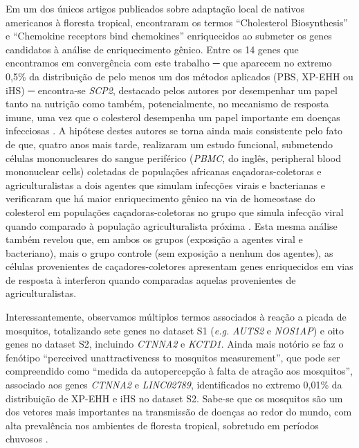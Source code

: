 Em um dos únicos artigos publicados sobre adaptação local de nativos americanos à floresta tropical,  encontraram os termos “Cholesterol Biosynthesis” e “Chemokine receptors bind chemokines” enriquecidos ao submeter os genes candidatos à análise de enriquecimento gênico. Entre os 14 genes que encontramos em convergência com este trabalho ─ que aparecem no extremo 0,5\% da distribuição de pelo menos um dos métodos aplicados (PBS, XP-EHH ou iHS) ─ encontra-se \textsl{SCP2}, destacado pelos autores por desempenhar um papel tanto na nutrição como também, potencialmente, no mecanismo de resposta imune, uma vez que o colesterol desempenha um papel importante em doenças infecciosas \cite{lee_cholesterol_2008}. A hipótese destes autores se torna ainda mais consistente pelo fato de que, quatro anos mais tarde,  realizaram um estudo funcional, submetendo células mononucleares do sangue periférico (\textit{PBMC}, do inglês, peripheral blood mononuclear cells) coletadas de populações africanas caçadoras-coletoras e agriculturalistas a dois agentes que simulam infecções virais e bacterianas e verificaram que há maior enriquecimento gênico na via de homeostase do colesterol em populações caçadoras-coletoras no grupo que simula infecção viral quando comparado à população agriculturalista próxima \cite{harrison_natural_2019}. Esta mesma análise também revelou que, em ambos os grupos (exposição a agentes viral e bacteriano), mais o grupo controle (sem exposição a nenhum dos agentes), as células provenientes de caçadores-coletores apresentam genes enriquecidos em vias de resposta à interferon quando comparadas aquelas provenientes de agriculturalistas.

Interessantemente, observamos múltiplos termos associados à reação a picada de mosquitos, totalizando sete genes no dataset S1 (\emph{e.g.} \textsl{AUTS2} e \textsl{NOS1AP}) e oito genes no dataset S2, incluindo \textsl{CTNNA2} e \textsl{KCTD1}. Ainda mais notório se faz o fenótipo “perceived unattractiveness to mosquitos measurement”, que pode ser compreendido como “medida da autopercepção à falta de atração aos mosquitos”, associado aos genes \textsl{CTNNA2} e \textsl{LINC02789}, identificados no extremo 0,01\% da distribuição de XP-EHH e iHS no dataset S2. Sabe-se que os mosquitos são um dos vetores mais importantes na transmissão de doenças ao redor do mundo, com alta prevalência nos ambientes de floresta tropical, sobretudo em períodos chuvosos \cite{de_araujo_nocturnal_2020}.


